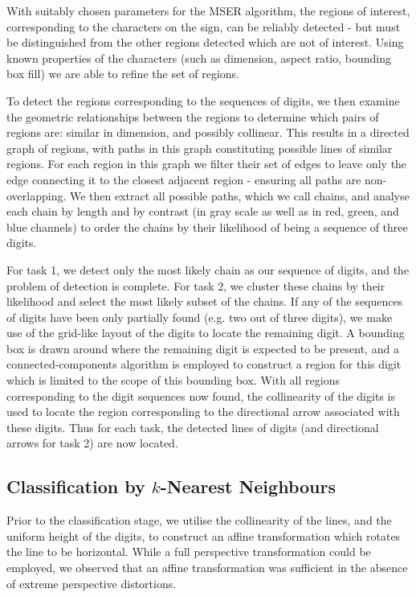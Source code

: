 \documentclass{article}
\begin{document}
With suitably chosen parameters for the MSER algorithm, the regions of interest,
corresponding to the characters on the sign, can be reliably detected - but must
be distinguished from the other regions detected which are not of interest.
Using known properties of the characters (such as dimension, aspect ratio,
bounding box fill) we are able to refine the set of regions.

To detect the regions corresponding to the sequences of digits, we then examine
the geometric relationships between the regions to determine which pairs of
regions are: similar in dimension, and possibly collinear.
This results in a directed graph of regions, with paths in this graph
constituting possible lines of similar regions.
For each region in this graph we filter their set of edges to leave only the
edge connecting it to the closest adjacent region - ensuring all paths are
non-overlapping.
We then extract all possible paths, which we call chains, and analyse each chain
by length and by contrast (in gray scale as well as in red, green, and blue
channels) to order the chains by their likelihood of being a sequence of three
digits.

For task 1, we detect only the most likely chain as our sequence of digits, and
the problem of detection is complete.
For task 2, we cluster these chains by their likelihood and select the most
likely subset of the chains.
If any of the sequences of digits have been only partially found (e.g. two out
of three digits), we make use of the grid-like layout of the digits to locate
the remaining digit.
A bounding box is drawn around where the remaining digit is expected to be
present, and a connected-components algorithm is employed to construct a region
for this digit which is limited to the scope of this bounding box.
With all regions corresponding to the digit sequences now found, the
collinearity of the digits is used to locate the region corresponding to the
directional arrow associated with these digits.
Thus for each task, the detected lines of digits (and directional arrows for
task 2) are now located.

\subsection{Classification by $k$-Nearest Neighbours}
\label{sec:imp-classification}

Prior to the classification stage, we utilise the collinearity of the lines, and
the uniform height of the digits, to construct an affine transformation which
rotates the line to be horizontal.
While a full perspective transformation could be employed, we observed that an
affine transformation was sufficient in the absence of extreme perspective
distortions.
\end{document}
